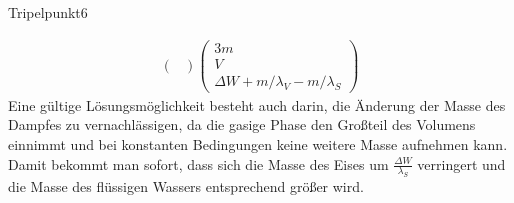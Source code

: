 \begin{problem}{Tripelpunkt}{6}
\begin{solution}
\[\begin{split}
\begin{pmatrix}
\end{pmatrix}
\begin{pmatrix}
3m \\ V \\ \Delta W + m / \lambda_V - m / \lambda_S
\end{pmatrix}
\end{split}
\]
Eine gültige Lösungsmöglichkeit besteht auch darin, die Änderung der Masse des Dampfes zu vernachlässigen, da die gasige Phase den Großteil des Volumens einnimmt und bei konstanten Bedingungen keine weitere Masse aufnehmen kann. Damit bekommt man sofort, dass sich die Masse des Eises um $\frac{\Delta W}{\lambda_S}$ verringert und die Masse des flüssigen Wassers entsprechend größer wird.
\end{solution}
\end{problem}

